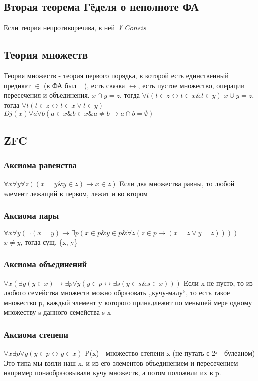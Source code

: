\documentclass[12pt]{article}
\begin{document}
\subsection{Вторая теорема Гёделя о неполноте ФА}
\label{sec-2-38}
Если теория непротиворечива, в ней $⊬ Consis$
\subsection{Теория множеств}
\label{sec-2-39}
Теория множеств - теория первого порядка, в которой
есть единственный предикат $\in$ (в ФА был =), есть связка
$\leftrightarrow$, есть пустое множество, операции пересечения и
объединения.
$x ∩ y = z$, тогда $∀t(t \in z \leftrightarrow t \in x \& t \in y)$
$x ∪ y = z$, тогда $∀t(t \in z \leftrightarrow t \in x \lor t \in y)$
$Dj(x) ∀a∀b(a \in x \& b \in x \& a \ne  b \to a ∩ b = ∅)$
\subsection{ZFC}
\label{sec-2-40}
\subsubsection{Аксиома равенства}
\label{sec-2-40-1}
$∀x∀y∀z((x = y \& y \in z) \to x \in z)$
Eсли два множества равны, то любой элемент лежащий в первом,
лежит и во втором
\subsubsection{Аксиома пары}
\label{sec-2-40-2}
$∀x∀y(\lnot (x=y) \to \exists p(x \in p \& y \in p \& ∀z(z \in p \to (x = z \lor y = z))))$
$x \ne  y$, тогда сущ. \{x, y\}
\subsubsection{Аксиома объединений}
\label{sec-2-40-3}
$∀x(\exists y(y\in x) \to \exists p∀y(y \in p \leftrightarrow \exists s(y \in s \& s \in x)))$
Eсли x не пусто, то из любого семейства множеств можно
образовать „кучу-малу“, то есть такое множество p,
каждый элемент y которого принадлежит по меньшей мере
одному множеству s данного семейства s x
\subsubsection{Аксиома степени}
\label{sec-2-40-4}
$∀x\exists p∀y(y \in p \leftrightarrow y \in x)$
P(x) - множество степени x (не путать с 2ˣ - булеаном)
Это типа мы взяли наш x, и из его элементов объединением и
пересечением например понаобразовывали кучу множеств, а потом
положили их в p.
\end{document}
